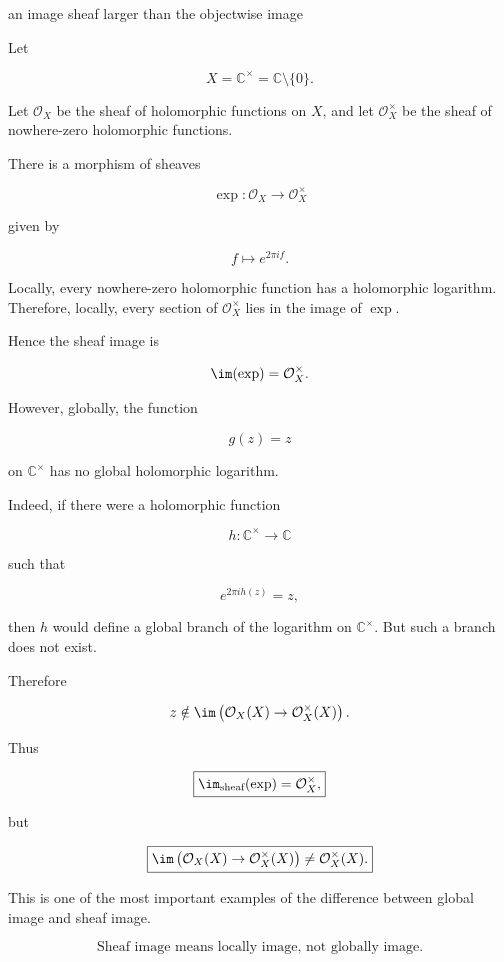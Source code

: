 \begin{problem}[CP-IV-0034]
\label{prob:cp-iv-0034}
an image sheaf larger than the objectwise image

Let

	\[
	X=\mathbb C^\times
	=
	\mathbb C\setminus\{0\}.
	\]

	Let $\mathcal O_X$ be the sheaf of holomorphic functions on $X$, and let
	$\mathcal O_X^\times$ be the sheaf of nowhere-zero holomorphic functions.

	There is a morphism of sheaves

	\[
	\exp:\mathcal O_X\to \mathcal O_X^\times
	\]

	given by

	\[
	f\longmapsto e^{2\pi i f}.
	\]

	Locally, every nowhere-zero holomorphic function has a holomorphic logarithm.
	Therefore, locally, every section of $\mathcal O_X^\times$ lies in the image of
	$\exp$.

	Hence the sheaf image is

	\[
	\im(\exp)=\mathcal O_X^\times.
	\]

	However, globally, the function

	\[
	g(z)=z
	\]

	on $\mathbb C^\times$ has no global holomorphic logarithm.

	Indeed, if there were a holomorphic function

	\[
	h:\mathbb C^\times\to\mathbb C
	\]

	such that

	\[
	e^{2\pi i h(z)}=z,
	\]

	then $h$ would define a global branch of the logarithm on $\mathbb C^\times$.
	But such a branch does not exist.

	Therefore

	\[
	z\notin
	\im\left(
	\mathcal O_X(X)\to \mathcal O_X^\times(X)
	\right).
	\]

	Thus

	\[
	\boxed{
		\im_{\text{sheaf}}(\exp)=\mathcal O_X^\times,
	}\]

	but

	\[
	\boxed{
		\im\left(
		\mathcal O_X(X)\to \mathcal O_X^\times(X)
		\right)
		\neq
		\mathcal O_X^\times(X).
	}\]

	This is one of the most important examples of the difference between global
	image and sheaf image.

	\[
	\boxed{
		\text{Sheaf image means locally image, not globally image.}
	}\]
\end{problem}

